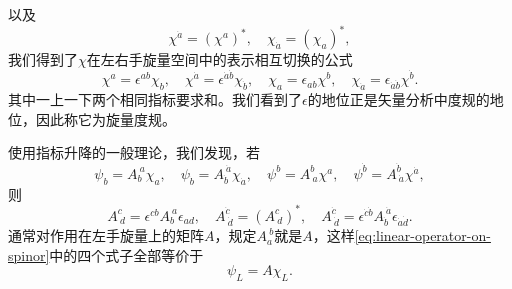 以及
\begin{equation}
    \chi^{\dot{a}} = (\chi^a)^*, \quad \chi_{\dot{a}} = (\chi_a)^*,
\end{equation}
我们得到了$\chi$在左右手旋量空间中的表示相互切换的公式
\begin{equation}
    \chi^a = \epsilon^{ab} \chi_b, \quad \chi^{\dot{a}} = \epsilon^{\dot{a} \dot{b}} \chi_{\dot{b}}, \quad \chi_a = \epsilon_{ab} \chi^b, \quad \chi_{\dot{a}} = \epsilon_{\dot{a} \dot{b}} \chi^{\dot{b}}.
\end{equation}
其中一上一下两个相同指标要求和。我们看到了$\epsilon$的地位正是矢量分析中度规的地位，因此称它为旋量度规。

使用指标升降的一般理论，我们发现，若
\begin{equation}
    \psi_b = A_b^{\ a} \chi_a, \quad \psi_{\dot{b}} = A_{\dot{b}}^{\ \dot{a}} \chi_{\dot{a}}, \quad \psi^b = A^b_{\ a} \chi^a, \quad \psi^{\dot{b}} = A^{\dot{b}}_{\ \dot{a}} \chi^{\dot{a}},
    \label{eq:linear-operator-on-spinor}
\end{equation}
则
\begin{equation}
    A^c_{\ d} = \epsilon^{cb} A_{b}^{\ a}\epsilon_{ad}, \quad A^{\dot{c}}_{\ \dot{d}} = (A^c_{\ d})^*, \quad A^{\dot{c}}_{\ \dot{d}} = \epsilon^{\dot{c} \dot{b}} A_{\dot{b}}^{\ \dot{a}} \epsilon_{\dot{a}\dot{d}}.
    \label{eq:left-right-matrix-transform}
\end{equation}
通常对作用在左手旋量上的矩阵$A$，规定$A_a^{\ b}$就是$A$，这样\eqref{eq:linear-operator-on-spinor}中的四个式子全部等价于
\[
    \psi_L = A \chi_L.
\]

